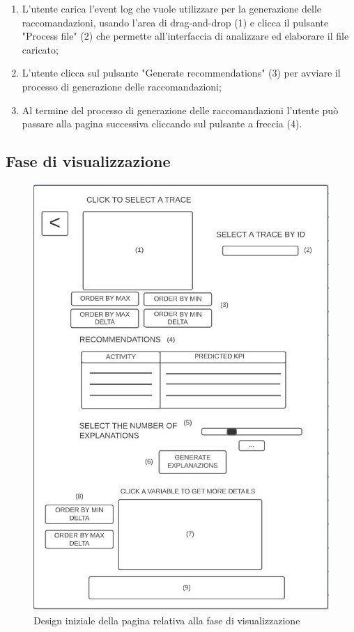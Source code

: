 \begin{enumerate}

\item L'utente carica l'event log che vuole utilizzare per la generazione delle raccomandazioni, usando l'area di drag-and-drop (1) e clicca il pulsante "Process file" (2) che permette all'interfaccia di analizzare ed elaborare il file caricato;

\item L'utente clicca sul pulsante "Generate recommendations" (3) per avviare il processo di generazione delle raccomandazioni;

\item Al termine del processo di generazione delle raccomandazioni l'utente può passare alla pagina successiva cliccando sul pulsante a freccia (4).

\end{enumerate}


\subsection{Fase di visualizzazione}

\begin{figure}[!h] 
    \centering 
    \includegraphics[width=0.7\columnwidth]{immagini/mockup-explain.jpg} 
    \caption{Design iniziale della pagina relativa alla fase di visualizzazione}
    \label{fig:mockup-explain}
\end{figure}

